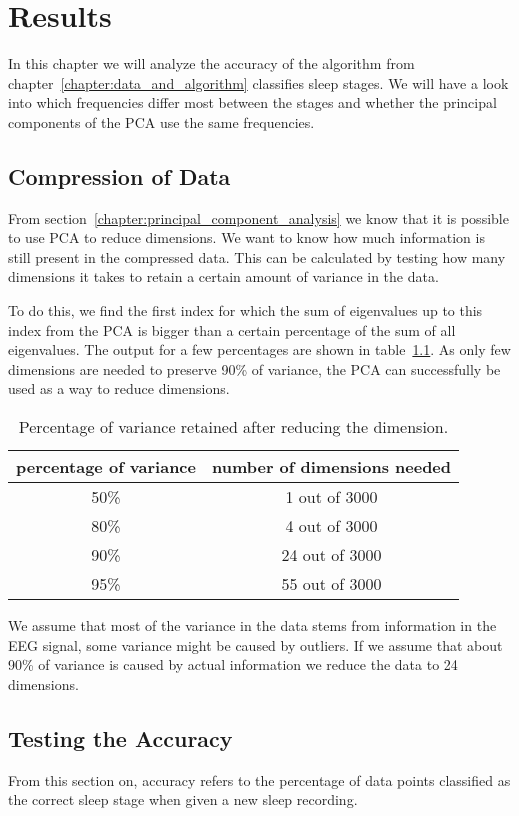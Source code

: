 \chapter{Results}
\label{chapter:results}

In this chapter we will analyze the accuracy of the algorithm from chapter~\ref{chapter:data_and_algorithm} classifies sleep stages. We will have a look into which frequencies differ most between the stages and whether the principal components of the PCA use the same frequencies.

\section{Compression of Data}
From section~\ref{chapter:principal_component_analysis} we know that it is possible to use PCA to reduce dimensions. We want to know how much information is still present in the compressed data. This can be calculated by testing how many dimensions it takes to retain a certain amount of variance in the data.

To do this, we find the first index for which the sum of eigenvalues up to this index from the PCA is bigger than a certain percentage of the sum of all eigenvalues. The output for a few percentages are shown in table~\ref{tab:explained_variance}. As only few dimensions are needed to preserve 90\% of variance, the PCA can successfully be used as a way to reduce dimensions.

\begin{table}[h]
	\centering
	\begin{tabular}{c|c}
		percentage of variance & number of dimensions needed \\
		\hline
		50\% & 1 out of 3000 \\
		80\% & 4 out of 3000 \\
		90\% & 24 out of 3000 \\
		95\% & 55 out of 3000 \\
	\end{tabular}
	\caption{Percentage of variance retained after reducing the dimension.}
	\label{tab:explained_variance}
\end{table}

We assume that most of the variance in the data stems from information in the EEG signal, some variance might be caused by outliers. If we assume that about 90\% of variance is caused by actual information we reduce the data to 24 dimensions.

\section{Testing the Accuracy}
From this section on, accuracy refers to the percentage of data points classified as the correct sleep stage when given a new sleep recording.

